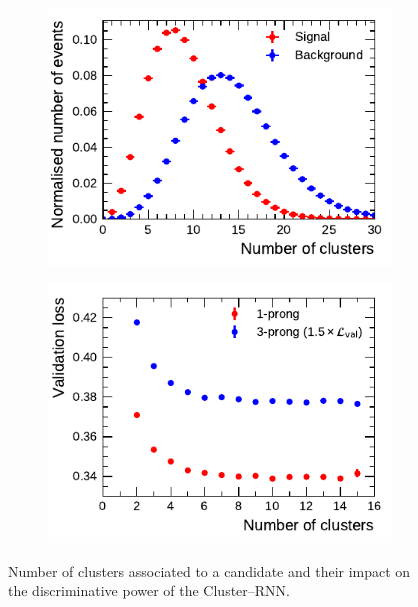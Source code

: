\begin{figure}[htb]
  \begin{subfigure}[t]{0.48\textwidth}
    \centering
    \includegraphics{./figures/rnn/ncls_1p.pdf}
  \end{subfigure}\hfill
  \begin{subfigure}[t]{0.48\textwidth}
    \centering
    \includegraphics{./figures/rnn/nscan/cluster_1p_3p.pdf}
  \end{subfigure}
  \caption{Number of clusters associated to a \tauhadvis candidate and their
    impact on the discriminative power of the Cluster--RNN.}
  \label{fig:rnn_nclusters}
\end{figure}

